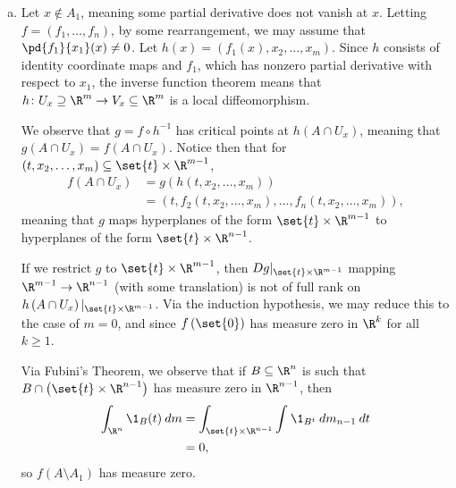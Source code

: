 \documentclass[10pt]{mypackage}
\begin{document}
\begin{solution}\hfill
  \begin{enumerate}[(a)]
    \item Let $x\notin A_1$, meaning some partial derivative does not vanish at $x$. Letting $f = \left( f_1,\dots,f_n \right)$, by some rearrangement, we may assume that $ \pd{f_1}{x_1}(x) \neq 0 $. Let $h(x) = \left( f_1(x),x_2,\dots,x_m \right)$. Since $h$ consists of identity coordinate maps and $f_1$, which has nonzero partial derivative with respect to $x_1$, the inverse function theorem means that $h\colon U_{x}\supseteq \R^{m}\rightarrow V_x\subseteq \R^{m}$ is a local diffeomorphism.\newline

      We observe that $g = f\circ h^{-1}$ has critical points at $h\left( A\cap U_{x} \right)$, meaning that $g\left( A\cap U_x \right) = f\left( A\cap U_x \right)$. Notice then that for $\left( t,x_2,\dots,x_m \right)\subseteq \set{t}\times \R^{m-1}$,
      \begin{align*}
        f\left( A\cap U_x \right) &= g \left( h\left( t,x_2,\dots,x_m \right) \right)\\
                                  &= \left( t,f_2\left( t,x_2,\dots,x_m \right),\dots,f_n\left( t,x_2,\dots,x_m \right) \right),
      \end{align*}
      meaning that $g$ maps hyperplanes of the form $\set{t}\times \R^{m-1}$ to hyperplanes of the form $\set{t}\times \R^{n-1}$.\newline

      If we restrict $g$ to $\set{t}\times \R^{m-1}$, then $Dg|_{\set{t}\times \R^{m-1}}$ mapping $\R^{m-1}\rightarrow \R^{n-1}$ (with some translation) is not of full rank on $h\left( A\cap U_x \right)|_{\set{t}\times \R^{m-1}}$. Via the induction hypothesis, we may reduce this to the case of $m = 0$, and since $f\left(\set{0}\right)$ has measure zero in $\R^{k}$ for all $k\geq 1$.\newline

      Via Fubini's Theorem, we observe that if $B\subseteq \R^{n}$ is such that $B\cap \left( \set{t}\times \R^{n-1} \right)$ has measure zero in $\R^{n-1}$, then
      \begin{align*}
        \int_{\R^{n}}^{} \1_{B}(t)\:dm &= \int_{\set{t}\times \R^{n-1}}^{} \int_{}^{} \1_{B^{t}}\:dm_{n-1} \:dt\\
                                       &= 0,
      \end{align*}
      so $f\left( A\setminus A_1 \right)$ has measure zero.
  \end{enumerate}
\end{solution}
\end{document}
